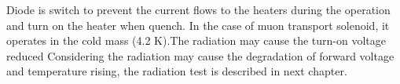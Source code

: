Diode is switch to prevent the current flows to the heaters during the operation and turn on the heater when quench.
In the case of muon transport solenoid, it operates in the cold mass (4.2 K).The radiation may cause the turn-on voltage reduced 
Considering the radiation may cause the degradation of forward voltage and temperature rising, the radiation test is described in next chapter.




